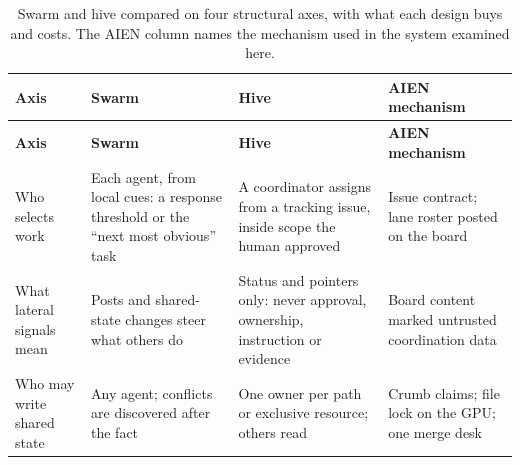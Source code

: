 \documentclass[11pt]{article}
\begin{document}
\begin{longtable}[]{@{}
  >{\raggedright\arraybackslash}p{}
  >{\raggedright\arraybackslash}p{}
  >{\raggedright\arraybackslash}p{}
  >{\raggedright\arraybackslash}p{}@{}}
\caption{Swarm and hive compared on four structural axes, with what each design buys and costs. The AIEN column names the mechanism used in the system examined here.}\tabularnewline
\toprule\noalign{}
\begin{minipage}[b]{\linewidth}\raggedright
\textbf{Axis}
\end{minipage} & \begin{minipage}[b]{\linewidth}\raggedright
\textbf{Swarm}
\end{minipage} & \begin{minipage}[b]{\linewidth}\raggedright
\textbf{Hive}
\end{minipage} & \begin{minipage}[b]{\linewidth}\raggedright
\textbf{AIEN mechanism}
\end{minipage} \\
\midrule\noalign{}
\endfirsthead
\toprule\noalign{}
\begin{minipage}[b]{\linewidth}\raggedright
\textbf{Axis}
\end{minipage} & \begin{minipage}[b]{\linewidth}\raggedright
\textbf{Swarm}
\end{minipage} & \begin{minipage}[b]{\linewidth}\raggedright
\textbf{Hive}
\end{minipage} & \begin{minipage}[b]{\linewidth}\raggedright
\textbf{AIEN mechanism}
\end{minipage} \\
\midrule\noalign{}
\endhead
\bottomrule\noalign{}
\endlastfoot
Who selects work & Each agent, from local cues: a response threshold or the ``next most obvious'' task & A coordinator assigns from a tracking issue, inside scope the human approved & Issue contract; lane roster posted on the board \\
What lateral signals mean & Posts and shared-state changes steer what others do & Status and pointers only: never approval, ownership, instruction or evidence & Board content marked untrusted coordination data \\
Who may write shared state & Any agent; conflicts are discovered after the fact & One owner per path or exclusive resource; others read & Crumb claims; file lock on the GPU; one merge desk \\

\end{longtable}
\end{document}
